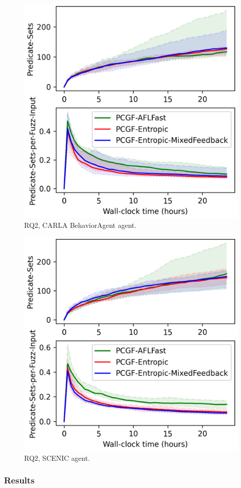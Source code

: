 \begin{figure}
    \centering
    \includegraphics[width=0.6\linewidth]{figures/chapter5/RQ2/(PCGF-AFLFast,PCGF-Entropic,PCGF-Entropic-MixedFeedback)_BehaviorAgent_all-coverage_(Predicate-Sets,Predicate-Sets-per-Fuzz-Input).png}
    \caption{RQ2, CARLA BehaviorAgent agent.}
    \label{fig:RQ2-BehaviorAgent}
\end{figure}


\begin{figure}
    \centering
    \includegraphics[width=0.6\linewidth]{figures/chapter5/RQ2/(PCGF-AFLFast,PCGF-Entropic,PCGF-Entropic-MixedFeedback)_intersectionAgent_all-coverage_(Predicate-Sets,Predicate-Sets-per-Fuzz-Input).png}
    \caption{RQ2, SCENIC agent.}
    \label{fig:RQ2-SCENICAgent}
\end{figure}


\subsubsection{Results}

